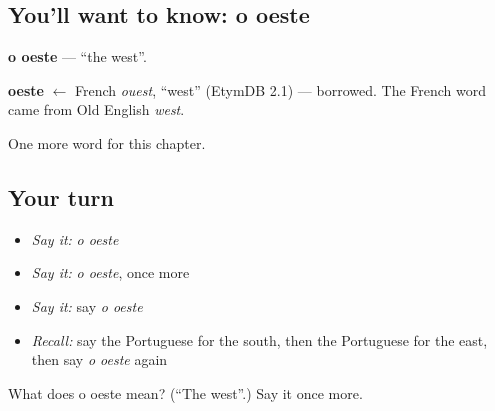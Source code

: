 \subsection*{You'll want to know: o oeste}
\textbf{o oeste} — \textquotedblleft{}the west\textquotedblright{}.

\begin{cousinweb}
\textbf{oeste} $\leftarrow$ French \emph{ouest}, \textquotedblleft{}west\textquotedblright{} (EtymDB 2.1) — borrowed. The French word came from Old English \emph{west}.
\end{cousinweb}

\begin{grammarlens}[title={What you've built}]
One more word for this chapter.
\end{grammarlens}

\subsection*{Your turn}
\begin{itemize}
\raggedright
  \item \emph{Say it:} \emph{o oeste}
  \item \emph{Say it:} \emph{o oeste}, once more
  \item \emph{Say it:} say \emph{o oeste}
  \item \emph{Recall:} say the Portuguese for the south, then the Portuguese for the east, then say \emph{o oeste} again
\end{itemize}

\begin{tcolorbox}[breakable,colback=teal!4,colframe=teal!35!black,title={Before you move on}]
What does o oeste mean? (\textquotedblleft{}The west\textquotedblright{}.) Say it once more.
\end{tcolorbox}
